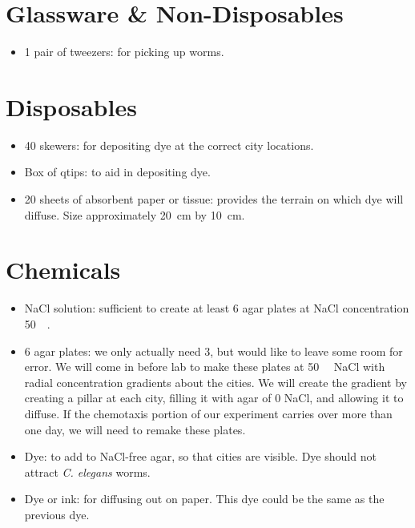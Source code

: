 \documentclass[11pt]{article}
\title{\vspace{-1em}{\underline{Independent Laboratory: Materials List}}\vspace{-.5em}}
\author{Benjamin Huang \& Shiye Su}
\date{}
\begin{document}
\maketitle

\section{Glassware \& Non-Disposables}

\begin{itemize}

	\item 1 pair of tweezers: for picking up worms.
	
\end{itemize}


\section{Disposables}

\begin{itemize}

	\item 40 skewers: for depositing dye at the correct city locations. 
	
	\item Box of qtips: to aid in depositing dye. 
	
	\item 20 sheets of absorbent paper or tissue: provides the terrain on which dye will diffuse. Size approximately \SI{20}{\centi \metre} by \SI{10}{\centi \metre}. 
	
\end{itemize}


\section{Chemicals}

\begin{itemize}
	
	\item NaCl solution: sufficient to create at least 6 agar plates at NaCl concentration \SI{50}{\milli \molar}.

	\item 6 agar plates: we only actually need 3, but would like to leave some room for error. We will come in before lab to make these plates at \SI{50}{\milli \molar} NaCl with radial concentration gradients about the cities. We will create the gradient by creating a pillar at each city, filling it with agar of 0 NaCl, and allowing it to diffuse. If the chemotaxis portion of our experiment carries over more than one day, we will need to remake these plates.
	
	\item Dye: to add to NaCl-free agar, so that cities are visible. Dye should not attract \emph{C. elegans} worms.
	
	\item Dye or ink: for diffusing out on paper. This dye could be the same as the previous dye. 
	
\end{itemize}
\end{document}
